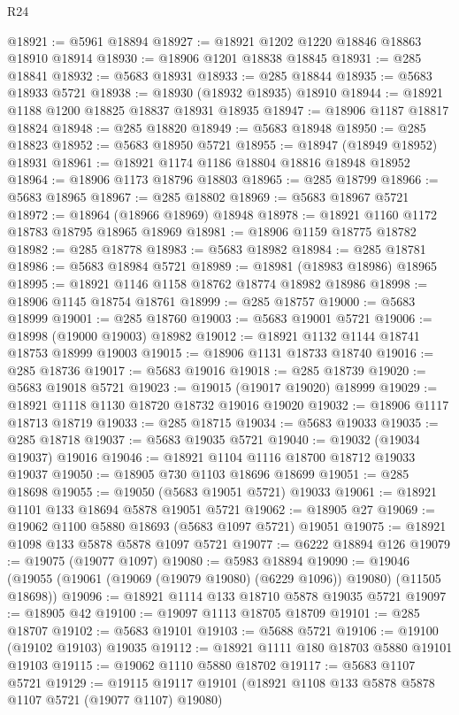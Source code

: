 \begin{lexlean}{R24}
\begin{coremodule}
@18921 := @5961 @18894
@18927 := @18921 @1202 @1220 @18846 @18863 @18910 @18914
@18930 := @18906 @1201 @18838 @18845
@18931 := @285 @18841
@18932 := @5683 @18931
@18933 := @285 @18844
@18935 := @5683 @18933 @5721
@18938 := @18930 (@18932 @18935) @18910
@18944 := @18921 @1188 @1200 @18825 @18837 @18931 @18935
@18947 := @18906 @1187 @18817 @18824
@18948 := @285 @18820
@18949 := @5683 @18948
@18950 := @285 @18823
@18952 := @5683 @18950 @5721
@18955 := @18947 (@18949 @18952) @18931
@18961 := @18921 @1174 @1186 @18804 @18816 @18948 @18952
@18964 := @18906 @1173 @18796 @18803
@18965 := @285 @18799
@18966 := @5683 @18965
@18967 := @285 @18802
@18969 := @5683 @18967 @5721
@18972 := @18964 (@18966 @18969) @18948
@18978 := @18921 @1160 @1172 @18783 @18795 @18965 @18969
@18981 := @18906 @1159 @18775 @18782
@18982 := @285 @18778
@18983 := @5683 @18982
@18984 := @285 @18781
@18986 := @5683 @18984 @5721
@18989 := @18981 (@18983 @18986) @18965
@18995 := @18921 @1146 @1158 @18762 @18774 @18982 @18986
@18998 := @18906 @1145 @18754 @18761
@18999 := @285 @18757
@19000 := @5683 @18999
@19001 := @285 @18760
@19003 := @5683 @19001 @5721
@19006 := @18998 (@19000 @19003) @18982
@19012 := @18921 @1132 @1144 @18741 @18753 @18999 @19003
@19015 := @18906 @1131 @18733 @18740
@19016 := @285 @18736
@19017 := @5683 @19016
@19018 := @285 @18739
@19020 := @5683 @19018 @5721
@19023 := @19015 (@19017 @19020) @18999
@19029 := @18921 @1118 @1130 @18720 @18732 @19016 @19020
@19032 := @18906 @1117 @18713 @18719
@19033 := @285 @18715
@19034 := @5683 @19033
@19035 := @285 @18718
@19037 := @5683 @19035 @5721
@19040 := @19032 (@19034 @19037) @19016
@19046 := @18921 @1104 @1116 @18700 @18712 @19033 @19037
@19050 := @18905 @730 @1103 @18696 @18699
@19051 := @285 @18698
@19055 := @19050 (@5683 @19051 @5721) @19033
@19061 := @18921 @1101 @133 @18694 @5878 @19051 @5721
@19062 := @18905 @27
@19069 := @19062 @1100 @5880 @18693 (@5683 @1097 @5721) @19051
@19075 := @18921 @1098 @133 @5878 @5878 @1097 @5721
@19077 := @6222 @18894 @126
@19079 := @19075 (@19077 @1097)
@19080 := @5983 @18894
@19090 := @19046 (@19055 (@19061 (@19069 (@19079 @19080) (@6229 @1096)) @19080) (@11505 @18698))
@19096 := @18921 @1114 @133 @18710 @5878 @19035 @5721
@19097 := @18905 @42
@19100 := @19097 @1113 @18705 @18709
@19101 := @285 @18707
@19102 := @5683 @19101
@19103 := @5688 @5721
@19106 := @19100 (@19102 @19103) @19035
@19112 := @18921 @1111 @180 @18703 @5880 @19101 @19103
@19115 := @19062 @1110 @5880 @18702
@19117 := @5683 @1107 @5721
@19129 := @19115 @19117 @19101 (@18921 @1108 @133 @5878 @5878 @1107 @5721 (@19077 @1107) @19080)

\end{coremodule}
\end{lexlean}

